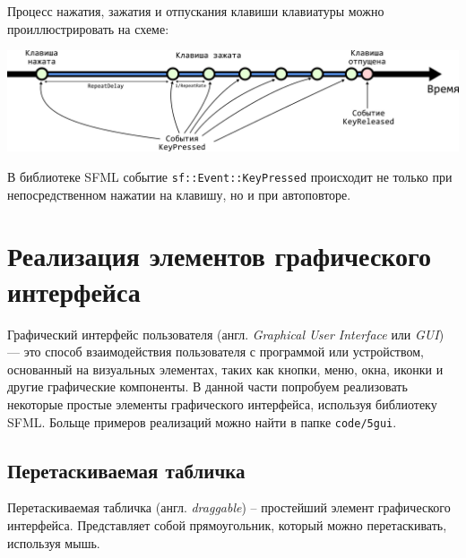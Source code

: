 \documentclass{article}
\begin{document}
Процесс нажатия, зажатия и отпускания клавиши клавиатуры можно проиллюстрировать на схеме:

\begin{center}
\includegraphics[scale=1]{../images/keyboard_presses.png}
\end{center}

В библиотеке SFML событие \texttt{sf::Event::KeyPressed} происходит не только при непосредственном нажатии на клавишу, но и при автоповторе.


\newpage
\section{Реализация элементов графического интерфейса}
Графический интерфейс пользователя (англ. \textit{Graphical User Interface} или \textit{GUI}) — это способ взаимодействия пользователя с программой или устройством, основанный на визуальных элементах, таких как кнопки, меню, окна, иконки и другие графические компоненты. В данной части попробуем реализовать некоторые простые элементы графического интерфейса, используя библиотеку SFML.
Больще примеров реализаций можно найти в папке \texttt{code/5gui}.

\subsection*{Перетаскиваемая табличка}
Перетаскиваемая табличка (англ. \textit{draggable}) -- простейший элемент графического интерфейса. Представляет собой прямоугольник, который можно перетаскивать, используя  мышь.
\end{document}
